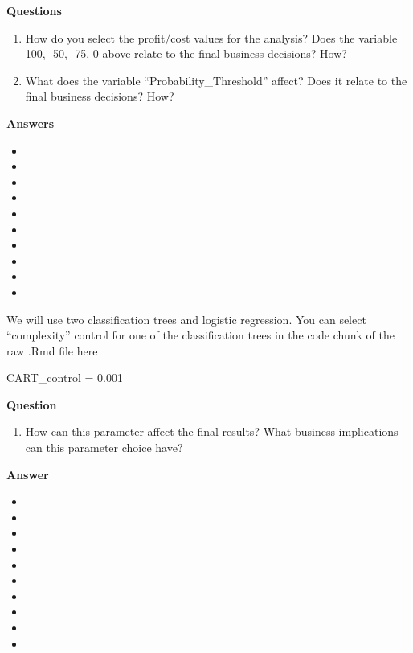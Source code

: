 \documentclass[
]{article}
\newenvironment{Shaded}{\begin{snugshade}}{\end{snugshade}}
\newcommand{\FloatTok}[1]{\textcolor[rgb]{0.00,0.00,0.81}{#1}}
\newcommand{\NormalTok}[1]{#1}
\newcommand{\OtherTok}[1]{\textcolor[rgb]{0.56,0.35,0.01}{#1}}
\providecommand{\tightlist}{%
  \setlength{\itemsep}{0pt}\setlength{\parskip}{0pt}}
\begin{document}
\textbf{Questions}

\begin{enumerate}
\def\labelenumi{\arabic{enumi}.}
\tightlist
\item
  How do you select the profit/cost values for the analysis? Does the
  variable 100, -50, -75, 0 above relate to the final business
  decisions? How?
\item
  What does the variable ``Probability\_Threshold'' affect? Does it
  relate to the final business decisions? How?
\end{enumerate}

\textbf{Answers}

\begin{itemize}
\tightlist
\item
\item
\item
\item
\item
\item
\item
\item
\item
\item
\end{itemize}

We will use two classification trees and logistic regression. You can
select ``complexity'' control for one of the classification trees in the
code chunk of the raw .Rmd file here

\begin{Shaded}
\begin{Highlighting}[]
\NormalTok{CART\_control }\OtherTok{=} \FloatTok{0.001}
\end{Highlighting}
\end{Shaded}

\textbf{Question}

\begin{enumerate}
\def\labelenumi{\arabic{enumi}.}
\tightlist
\item
  How can this parameter affect the final results? What business
  implications can this parameter choice have?
\end{enumerate}

\textbf{Answer}

\begin{itemize}
\tightlist
\item
\item
\item
\item
\item
\item
\item
\item
\item
\item
\end{itemize}
\end{document}
